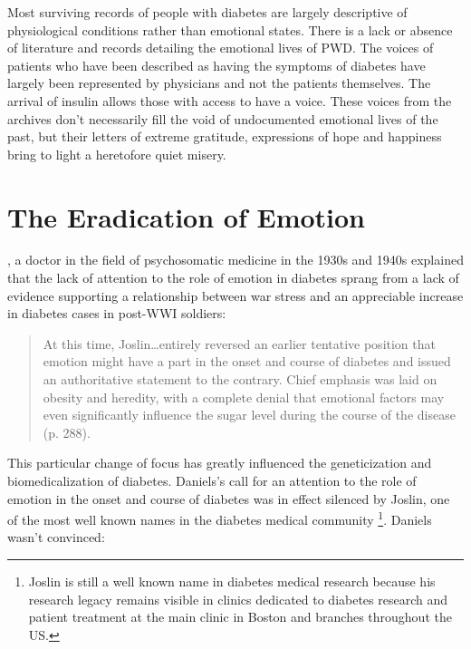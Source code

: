 \documentclass[12pt]{article}
\begin{document}
Most surviving records of people with diabetes are largely descriptive of physiological conditions rather than emotional states. There is a lack or absence of literature and records detailing the emotional lives of PWD. The voices of patients who have been described as having the symptoms of diabetes have largely been represented by physicians and not the patients themselves.  The arrival of insulin allows those with access to have a voice. These voices from the archives don't necessarily fill the void of undocumented emotional lives of the past, but their letters of extreme gratitude, expressions of hope and happiness bring to light a heretofore quiet misery. 

\section{The Eradication of Emotion} 
\doublespacing
\citet{daniels_role_1948}, a doctor in the field of psychosomatic medicine in the 1930s and 1940s explained that the lack of attention to the role of emotion in diabetes sprang from a lack of evidence supporting a relationship between war stress and an appreciable increase in diabetes cases in post-WWI soldiers:

\begin{singlespace}
  \begin{quote}
  At this time, Joslin\dots entirely reversed an earlier tentative position that emotion might have a part in the onset and course of diabetes and issued an authoritative statement to the contrary. Chief emphasis was laid on obesity and heredity, with a complete denial that emotional factors may even significantly influence the sugar level during the course of the disease (p. 288).
  \end{quote} 
\end{singlespace} 

This particular change of focus has greatly influenced the geneticization and biomedicalization of diabetes. Daniels's call for an attention to the role of emotion in the onset and course of diabetes was in effect silenced by Joslin, one of the most well known names in the diabetes medical community \footnote{Joslin is still a well known name in diabetes medical research because his research legacy remains visible in clinics dedicated to diabetes research and patient treatment at the main clinic in Boston and branches throughout the US.}. Daniels wasn't convinced: 
\end{document}

